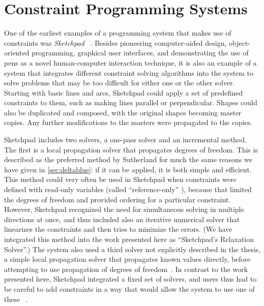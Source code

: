 \section{Constraint Programming Systems}
\label{sec:constr-progr-syst}

One of the earliest examples of a programming system that makes use of
constraints was \emph{Sketchpad}~\cite{sutherland-ifips-1963}%
. Besides pioneering computer-aided design, object-oriented programming,
graphical user interfaces, and demonstrating the use of pens as a novel
human-computer interaction technique, it is also an example of a system that
integrates different constraint solving algorithms into the system to solve
problems that may be too difficult for either one or the other solver. Starting
with basic lines and arcs, Sketchpad could apply a set of predefined constraints
to them, such as making lines parallel or perpendicular. Shapes could also be
duplicated and composed, with the original shapes becoming master copies. Any
further modifications to the masters were propagated to the copies.

Sketchpad includes two solvers, a one-pass solver and an incremental
method. The first is a local propagation solver that propagates degrees of
freedom. This is described as the preferred method by Sutherland for much the
same reasons we have given in \autoref{sec:deltablue}: if it can be applied, it
is both simple and efficient. This method could very often be used in Sketchpad
when constraints were defined with read-only variables (called
``reference-only'' %
), because that limited the degrees of freedom
and provided ordering for a particular constraint. However, Sketchpad%
recognized the need for simultaneous solving in multiple directions at once, and
thus included also an iterative numerical solver that linearizes the constraints
and then tries to minimize the errors. (We have integrated this method into the
work presented here as ``Sketchpad's Relaxation Solver''.)  %
The system also used a third solver not explicitly described in the
thesis, a simple local propagation solver that propagates known values directly,
before attempting to use propagation of degrees of freedom~\cite{borning2012architectures}. In contrast to the work presented here,
Sketchpad integrated a fixed set of solvers, and users thus had to be careful to
add constraints in a way that would allow the system to use one of these%
~\cite[p.112ff]{sutherland-ifips-1963}.

